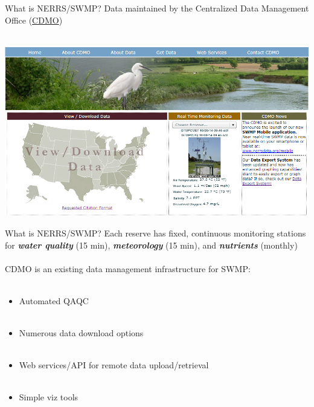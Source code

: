 \documentclass[serif]{beamer}\usepackage[]{graphicx}\usepackage[]{color}
\newcommand{\Bigtxt}[1]{\textbf{\textit{#1}}}
\begin{document}
\begin{frame}[t]{What is NERRS/SWMP?}
Data maintained by the Centralized Data Management Office (\href{http://cdmo.baruch.sc.edu/}{CDMO})\\~\\
\centerline{\includegraphics[width = \textwidth]{fig/cdmo_front.png}}
\end{frame}

\begin{frame}{What is NERRS/SWMP?}
Each reserve has fixed, continuous monitoring stations for \Bigtxt{water quality} (15 min), \Bigtxt{meteorology} (15 min), and \Bigtxt{nutrients} (monthly)\\~\\
CDMO is an existing data management infrastructure for SWMP:\\~\\
\begin{itemize}
\item Automated QAQC \\~\\
\item Numerous data download options \\~\\
\item Web services/API for remote data upload/retrieval \\~\\
\item Simple viz tools \\~\\
\end{itemize}
\end{frame}
\end{document}
